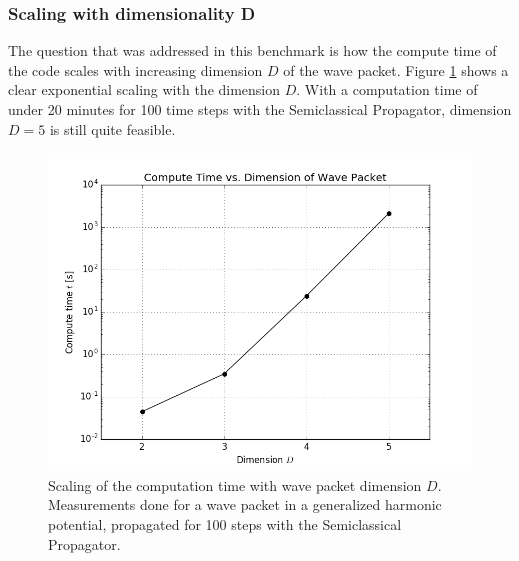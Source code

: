 \subsubsection{Scaling with dimensionality D}
%
The question that was addressed in this benchmark is how the compute time of the code scales with increasing dimension $D$ of the wave packet.
Figure \ref{fig:dimension_analysis} shows a clear exponential scaling with the dimension $D$.
With a computation time of under 20 minutes for 100 time steps with the Semiclassical Propagator, dimension $D=5$ is still quite feasible.
%
\begin{figure}[ht]
	\centering
	\includegraphics[width=.8\textwidth]{figures/dimension_analysis.png}
	\caption{Scaling of the computation time with wave packet dimension $D$. Measurements done for a wave packet in a generalized harmonic potential, propagated for 100 steps with the Semiclassical Propagator.}
	\label{fig:dimension_analysis}
\end{figure}
